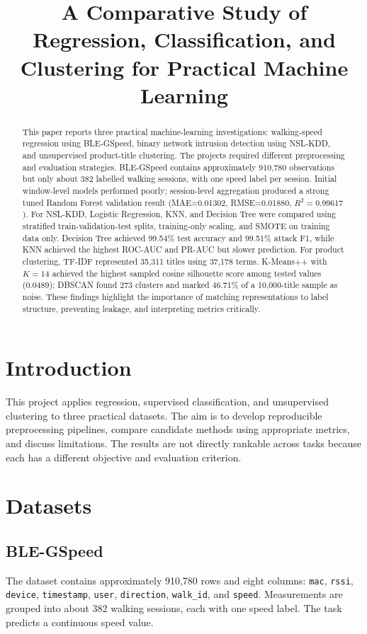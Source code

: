 \documentclass[conference]{IEEEtran}
\title{A Comparative Study of Regression, Classification, and Clustering for Practical Machine Learning}
\author{\IEEEauthorblockN{Md Ismail Hossain}\IEEEauthorblockA{MSc Applied Artificial Intelligence\\South East Technological University, Ireland\\Email: ismail.ru.cse@gmail.com}}
\begin{document}
\maketitle
\begin{abstract}
This paper reports three practical machine-learning investigations: walking-speed regression using BLE-GSpeed, binary network intrusion detection using NSL-KDD, and unsupervised product-title clustering. The projects required different preprocessing and evaluation strategies. BLE-GSpeed contains approximately 910,780 observations but only about 382 labelled walking sessions, with one speed label per session. Initial window-level models performed poorly; session-level aggregation produced a strong tuned Random Forest validation result (MAE=0.01302, RMSE=0.01880, $R^2=0.99617$). For NSL-KDD, Logistic Regression, KNN, and Decision Tree were compared using stratified train-validation-test splits, training-only scaling, and SMOTE on training data only. Decision Tree achieved 99.54\% test accuracy and 99.51\% attack F1, while KNN achieved the highest ROC-AUC and PR-AUC but slower prediction. For product clustering, TF-IDF represented 35,311 titles using 37,178 terms. K-Means++ with $K=14$ achieved the highest sampled cosine silhouette score among tested values (0.0489); DBSCAN found 273 clusters and marked 46.71\% of a 10,000-title sample as noise. These findings highlight the importance of matching representations to label structure, preventing leakage, and interpreting metrics critically.
\end{abstract}

\section{Introduction}
This project applies regression, supervised classification, and unsupervised clustering to three practical datasets. The aim is to develop reproducible preprocessing pipelines, compare candidate methods using appropriate metrics, and discuss limitations. The results are not directly rankable across tasks because each has a different objective and evaluation criterion.

\section{Datasets}
\subsection{BLE-GSpeed}
The dataset contains approximately 910,780 rows and eight columns: \texttt{mac}, \texttt{rssi}, \texttt{device}, \texttt{timestamp}, \texttt{user}, \texttt{direction}, \texttt{walk\_id}, and \texttt{speed}. Measurements are grouped into about 382 walking sessions, each with one speed label. The task predicts a continuous speed value.
\end{document}
